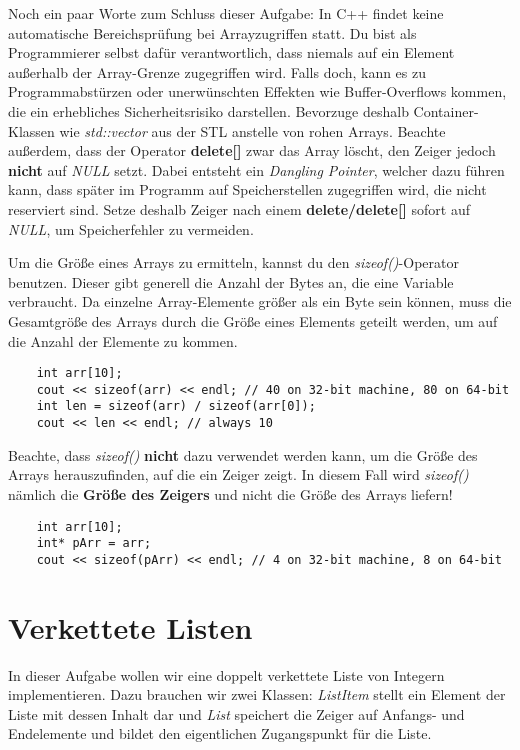 Noch ein paar Worte zum Schluss dieser Aufgabe:
In C++ findet keine automatische Bereichsprüfung bei Arrayzugriffen statt. Du bist als Programmierer selbst dafür verantwortlich, dass niemals auf ein Element außerhalb der Array-Grenze zugegriffen wird.
Falls doch, kann es zu Programmabstürzen oder unerwünschten Effekten wie  Buffer-Overflows kommen, die ein erhebliches Sicherheitsrisiko darstellen.
Bevorzuge deshalb Container-Klassen wie \emph{std::vector} aus der STL anstelle von \glqq rohen\grqq{} Arrays.
Beachte außerdem, dass der Operator \textbf{delete[]} zwar das Array löscht, den Zeiger jedoch \textbf{nicht} auf \emph{NULL} setzt.
Dabei entsteht ein \emph{Dangling Pointer}, welcher dazu führen kann, dass später im Programm auf Speicherstellen zugegriffen wird, die nicht reserviert sind.
Setze deshalb Zeiger nach einem \textbf{delete/delete[]} sofort auf \emph{NULL}, um Speicherfehler zu vermeiden.

Um die Größe eines Arrays zu ermitteln, kannst du den \emph{sizeof()}-Operator benutzen. Dieser gibt generell die Anzahl der Bytes an, die eine Variable verbraucht. Da einzelne Array-Elemente größer als ein Byte sein können, muss die Gesamtgröße des Arrays durch die Größe eines Elements geteilt werden, um auf die Anzahl der Elemente zu kommen.
\begin{lstlisting}
	int arr[10];
	cout << sizeof(arr) << endl; // 40 on 32-bit machine, 80 on 64-bit
	int len = sizeof(arr) / sizeof(arr[0]); 
	cout << len << endl; // always 10
\end{lstlisting}

Beachte, dass \emph{sizeof()} \textbf{nicht} dazu verwendet werden kann, um die Größe des Arrays herauszufinden, auf die ein Zeiger zeigt. In diesem Fall wird \emph{sizeof()} nämlich die \textbf{Größe des Zeigers} und nicht die Größe des Arrays liefern!
\begin{lstlisting}
	int arr[10];
	int* pArr = arr;
	cout << sizeof(pArr) << endl; // 4 on 32-bit machine, 8 on 64-bit
\end{lstlisting}


\section{Verkettete Listen}
In dieser Aufgabe wollen wir eine doppelt verkettete Liste von Integern implementieren.
Dazu brauchen wir zwei Klassen: 
\emph{ListItem} stellt ein Element der Liste mit dessen Inhalt dar und \emph{List} speichert die Zeiger auf Anfangs- und Endelemente und bildet den eigentlichen Zugangspunkt für die Liste.

